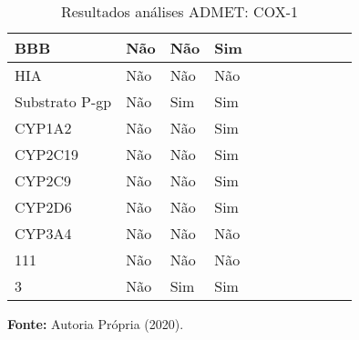 \documentclass{article}
\begin{document}
\begin{itemize}
\begin{table}[H]
\begin{tabular}{|p{2cm}|p{1cm}|p{1cm}|p{1cm}|p{1cm}|p{1cm}|p{1cm}|p{1cm}|p{1cm}|p{1cm}|p{1cm}|}
		\hline 
		BBB & Não & Não & Sim  & & & & & &  \\
		\hline
		HIA  & Não & Não & Não  & & & & & & \\    
		\hline
		Substrato P-gp & Não & Sim & Sim  & & & & & & \\   
		\hline
		CYP1A2 & Não & Não & Sim  & & & & &  & \\
		\hline
		CYP2C19 & Não & Não & Sim & & & & & & \\
		\hline
		CYP2C9& Não & Não & Sim  & & & & & & \\
		\hline
		CYP2D6 & Não & Não & Sim  & & & & & & \\
		\hline
		CYP3A4 & Não & Não  & Não  & & & & & & \\
		\hline
		111 & Não & Não & Não  & & & & & & \\
		\hline
		3 & Não & Sim & Sim   & & & & & & \\
		\hline
	\end{tabular}
	\caption{Resultados análises ADMET: COX-1} 
	\textbf{Fonte:} Autoria Própria (2020).
	\label{tab:R05}
\end{table}

\end{itemize}
\end{document}
